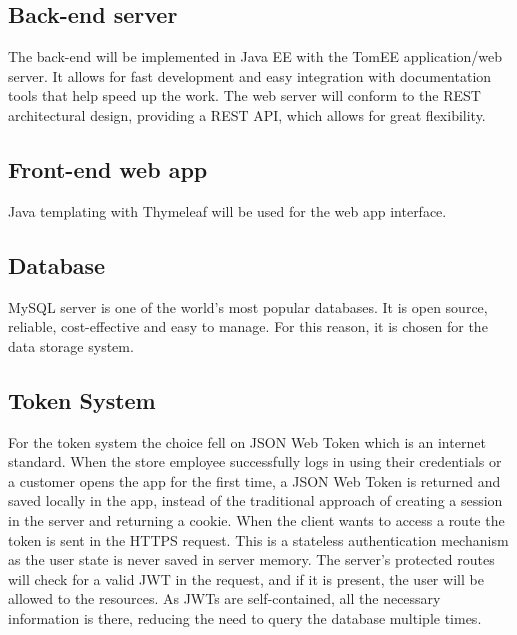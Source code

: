 \subsection{Back-end server}
The back-end will be implemented in Java EE with the TomEE application/web server.
It allows for fast development and easy integration with documentation tools that help speed up the work.\newline
The web server will conform to the REST architectural design, providing a REST API, which allows for great flexibility.
 
\subsection{Front-end web app}
Java templating with Thymeleaf will be used for the web app interface.

\subsection{Database}
MySQL server is one of the world’s most popular databases. It is open source, reliable, cost-effective and easy to manage. For this reason, it is chosen for the data storage system.

\subsection{Token System}
For the token system the choice fell on JSON Web Token which is an internet standard.\newline
When the store employee successfully logs in using their credentials or a customer opens the app for the first time, a JSON Web Token is returned and saved locally in the app, instead of the traditional approach of creating a session in the server and returning a cookie.\newline
When the client wants to access a route the token is sent in the HTTPS request. This is a stateless authentication mechanism as the user state is never saved in server memory. The server's protected routes will check for a valid JWT in the request, and if it is present, the user will be allowed to the resources.\newline
As JWTs are self-contained, all the necessary information is there, reducing the need to query the database multiple times.

